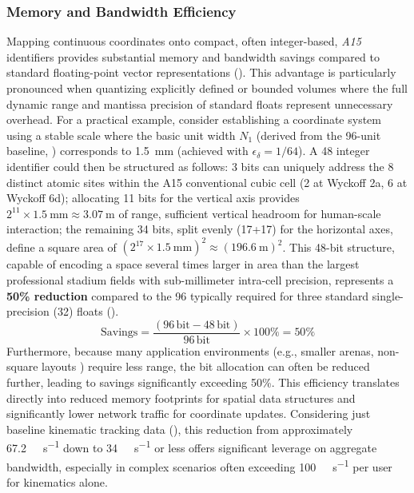 \documentclass[10pt]{article}
\def\AAAB{\textit{A15}}
\begin{document}
\subsubsection{Memory and Bandwidth Efficiency}\label{subsubsec-benefits-efficiency}
Mapping continuous coordinates onto compact, often integer-based, \AAAB{} identifiers provides substantial memory and bandwidth savings compared to standard floating-point vector representations (). This advantage is particularly pronounced when quantizing explicitly defined or bounded volumes where the full dynamic range and mantissa precision of standard floats represent unnecessary overhead. For a practical example, consider establishing a coordinate system using a stable scale where the basic unit width $N_1$ (derived from the 96-unit baseline, ) corresponds to \SI{1.5}{\milli\meter} (achieved with $\epsilon_\delta=1/64$). A \SI{48}{\bit} integer identifier could then be structured as follows: 3 bits can uniquely address the 8 distinct atomic sites within the A15 conventional cubic cell (2 at Wyckoff 2a, 6 at Wyckoff 6d); allocating 11 bits for the vertical axis provides $2^{11} \times \SI{1.5}{\milli\meter} \approx \SI{3.07}{\meter}$ of range, sufficient vertical headroom for human-scale interaction; the remaining 34 bits, split evenly (17+17) for the horizontal axes, define a square area of $(2^{17} \times \SI{1.5}{\milli\meter})^2 \approx (\SI{196.6}{\meter})^2$. This 48-bit structure, capable of encoding a space several times larger in area than the largest professional stadium fields with sub-millimeter intra-cell precision, represents a \textbf{50\% reduction} compared to the \SI{96}{\bit} typically required for three standard single-precision (\SI{32}{\bit}) floats ().
\begin{equation} \label{eq-efficiency-memory}
    \text{Savings} = \frac{(96\,\text{bit} - 48\,\text{bit})}{96\,\text{bit}} \times 100\% = 50\%
\end{equation}
Furthermore, because many application environments (e.g., smaller arenas, non-square layouts \cite{Risinger2024Layoutc}) require less range, the bit allocation can often be reduced further, leading to savings significantly exceeding 50\%. This efficiency translates directly into reduced memory footprints for spatial data structures and significantly lower network traffic for coordinate updates. Considering just baseline kinematic tracking data (), this reduction from approximately \SI{67.2}{\kilo\bit\per\second} down to \SI{34}{\kilo\bit\per\second} or less offers significant leverage on aggregate bandwidth, especially in complex scenarios often exceeding \SI{100}{\kilo\bit\per\second} per user for kinematics alone.
\end{document}
